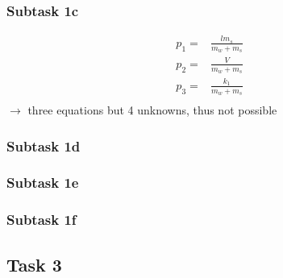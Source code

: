 \documentclass[a4paper, 12pt]{scrartcl}
\begin{document}
\subsubsection{Subtask 1c}
\begin{equation}
	\begin{split}
		p_1 = & \frac{l m_s}{m_w + m_s} \\
		p_2 = & \frac{V}{m_w + m_s} \\
		p_3 = & \frac{k_1}{m_w + m_s} \\
	\end{split}
\end{equation}
$\rightarrow$ three equations but 4 unknowns, thus not possible
\subsubsection{Subtask 1d}
\subsubsection{Subtask 1e}
\subsubsection{Subtask 1f}

\subsection{Task 3}
\end{document}
